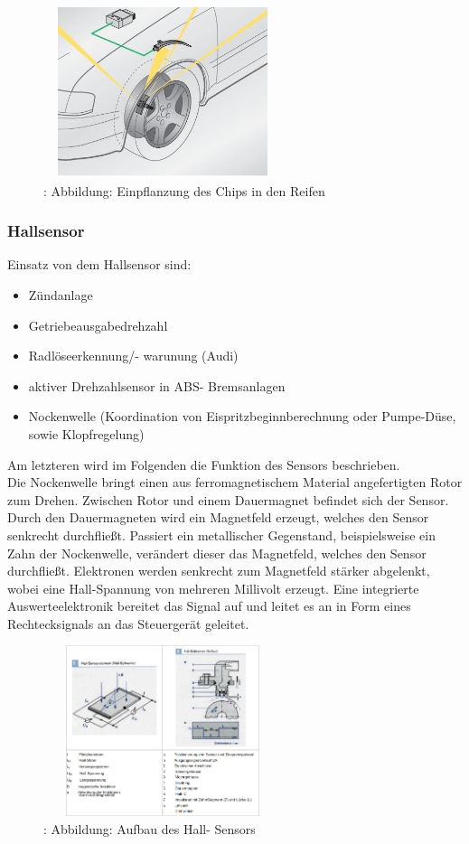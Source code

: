 				\begin{figure}
					\centering
					\includegraphics[width=7cm, height=5cm] {rdks.png}
					\caption {\cite{TS23}: Abbildung: Einpflanzung des Chips in den Reifen}
				\end{figure}
				
			\subsubsection{Hallsensor}
				Einsatz von dem Hallsensor sind: 
				\begin{itemize}
					\item Zündanlage
					\item Getriebeausgabedrehzahl
					\item Radlöseerkennung/- warunung (Audi)
					\item aktiver Drehzahlsensor in ABS- Bremsanlagen
					\item Nockenwelle (Koordination von Eispritzbeginnberechnung oder Pumpe-Düse, sowie Klopfregelung)
				\end{itemize}
				
				Am letzteren wird im Folgenden die Funktion des Sensors beschrieben.\\
				Die Nockenwelle bringt einen aus ferromagnetischem Material angefertigten Rotor zum Drehen. Zwischen Rotor und einem Dauermagnet befindet sich der Sensor. Durch den Dauermagneten wird ein Magnetfeld erzeugt, welches den Sensor senkrecht durchfließt. Passiert ein metallischer Gegenstand, beispielsweise ein Zahn der Nockenwelle, verändert dieser das Magnetfeld, welches den Sensor durchfließt.
				Elektronen werden senkrecht zum Magnetfeld stärker abgelenkt, wobei eine Hall-Spannung von mehreren Millivolt erzeugt. Eine integrierte Auswerteelektronik bereitet das Signal auf und leitet es an in Form eines Rechtecksignals an das Steuergerät geleitet.\\\cite{TS24}
				
				\begin{figure}
					\centering
					\includegraphics[width=7cm, height=5cm] {hall.png}
					\caption {\cite{TS25}: Abbildung: Aufbau des Hall- Sensors}
				\end{figure}
			
